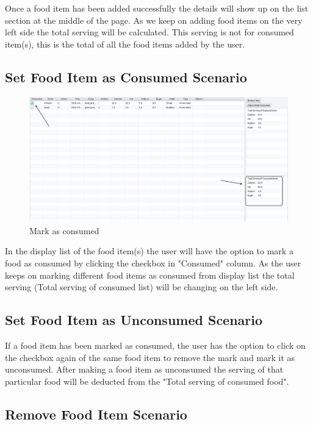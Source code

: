 \documentclass{scrreprt}
\begin{document}
\begin{enumerate}
\FloatBarrier
\end{enumerate}

Once a food item has been added successfully the details will show up on the list section at the middle of the page. As we keep on adding food items on the very left side the total serving will be calculated. This serving is not for consumed item(s), this is the total of all the food items added by the user.
\pagebreak
\subsection{Set Food Item as Consumed Scenario}

\begin{figure}[!htbp]
\centering
\includegraphics[width=15cm]{pictures/consumed.png}
\caption{Mark as consumed}
\end{figure}

\FloatBarrier

In the display list of the food item(s) the user will have the option to mark a food as consumed by clicking the checkbox in "Consumed" column. As the user keeps on marking different food items as consumed from display list the total serving (Total serving of consumed list) will be changing on the left side.

\subsection{Set Food Item as Unconsumed Scenario}

If a food item has been marked as consumed, the user has the option to click on the checkbox again of the same food item to remove the mark and mark it as unconsumed. After making a food item as unconsumed the serving of that particular food will be deducted from the "Total serving of consumed food".

\subsection{Remove Food Item Scenario}
\end{document}
